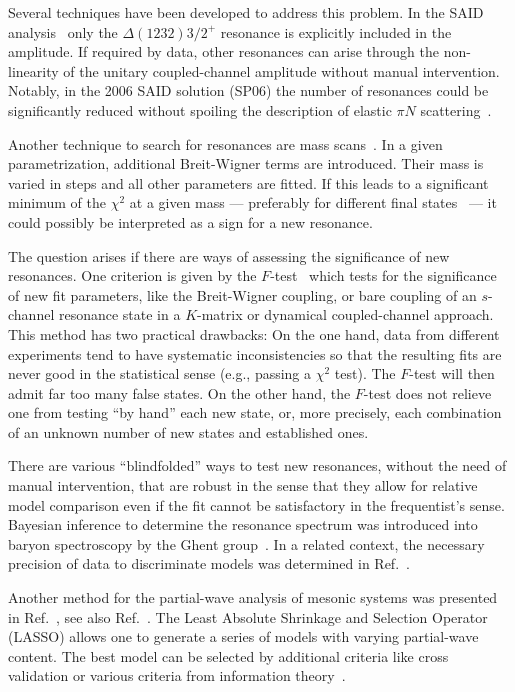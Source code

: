 \documentclass[10pt,aps,prc,superscriptaddress,twoside,twocolumn,nofootinbib,showpacs,preprintnumbers]{revtex4-1}
\begin{document}
Several techniques have been developed to address this problem. 
In the SAID analysis~\cite{Workman:2012jf, Workman:2012hx, Workman:2012jf, Workman:2012hx, Workman:2016irf, Tiator:2016btt} only the $\Delta(1232)3/2^+$ resonance is explicitly included in the amplitude. If required by data, other resonances can arise through the non-linearity of the unitary coupled-channel amplitude without manual intervention. Notably, in the 2006 SAID solution (SP06) the number of resonances could be significantly reduced without spoiling the description of elastic $\pi N$ scattering~\cite{Arndt:2006bf}.	

Another technique to search for resonances are mass scans~\cite{Arndt:2003ga, Azimov:2003bb, Anisovich:2015gia}. In a given parametrization, additional Breit-Wigner terms are introduced. Their mass is varied in steps and all other parameters are fitted. If this leads to a significant minimum of the $\chi^2$ at a given mass --- preferably for different final states~\cite{Anisovich:2015gia} --- it could possibly be interpreted as a sign for a new resonance. 

The question arises if there are ways of assessing the significance of new resonances. One criterion is given by the $F$-test~\cite{Wilkinson1981} which tests for the significance of new fit parameters, like the Breit-Wigner coupling, or bare coupling of an $s$-channel resonance state in a $K$-matrix or dynamical coupled-channel approach. This method has two practical drawbacks: On the one hand, data from different experiments tend to have systematic inconsistencies so that the resulting fits are never good in the statistical sense (e.g., passing a $\chi^2$ test). The $F$-test will then admit far too many false states. On the other hand, the $F$-test does not relieve one from testing ``by hand'' each new state, or, more precisely, each combination of an unknown number of new states and established ones. 

There are various ``blindfolded'' ways to test new resonances, without the need of manual intervention, that are robust in the sense that they allow for relative model comparison even if the fit cannot be satisfactory in the frequentist's sense. 
Bayesian inference to determine the resonance spectrum was introduced into baryon spectroscopy by the Ghent group~\cite{DeCruz:2012bv,DeCruz:2011xi}. In a related context, the necessary precision of data to discriminate models was determined in Ref.~\cite{Nys:2016uel}. 

Another method for the partial-wave analysis of mesonic systems was presented in Ref.~\cite{Guegan:2015mea}, see also Ref.~\cite{Williams:2017gwf}. The Least Absolute Shrinkage and Selection Operator (LASSO) allows one to generate a series of models with varying partial-wave content. The best model can be selected by additional criteria like cross validation or various criteria from information theory~\cite{Tibshirani2011, hastie2009the, james2013an}. 
\end{document}
